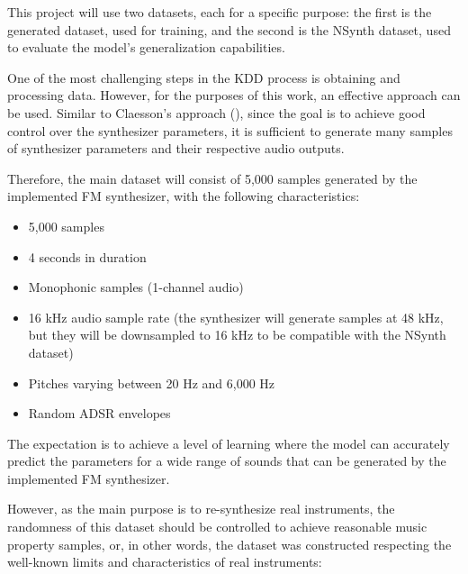 \documentclass[sigconf,natbib=false]{acmart}
\begin{document}
This project will use two datasets, each for a specific purpose: the first is the generated dataset, used for training, and the second is the NSynth dataset, used to evaluate the model's generalization capabilities.

One of the most challenging steps in the KDD process is obtaining and processing data. However, for the purposes of this work, an effective approach can be used. Similar to Claesson's approach (\textcite{claesson2021resynthesis}), since the goal is to achieve good control over the synthesizer parameters, it is sufficient to generate many samples of synthesizer parameters and their respective audio outputs.

Therefore, the main dataset will consist of 5,000 samples generated by the implemented FM synthesizer, with the following characteristics:

\begin{itemize}
\item 5,000 samples
\item 4 seconds in duration
\item Monophonic samples (1-channel audio)
\item 16 kHz audio sample rate (the synthesizer will generate samples at 48 kHz, but they will be downsampled to 16 kHz to be compatible with the NSynth dataset)
\item Pitches varying between 20 Hz and 6,000 Hz
\item Random ADSR envelopes
\end{itemize}

The expectation is to achieve a level of learning where the model can accurately predict the parameters for a wide range of sounds that can be generated by the implemented FM synthesizer.

However, as the main purpose is to re-synthesize real instruments, the randomness of this dataset should be controlled to achieve reasonable music property samples, or, in other words, the dataset was constructed respecting the well-known limits and characteristics of real instruments:
\end{document}
